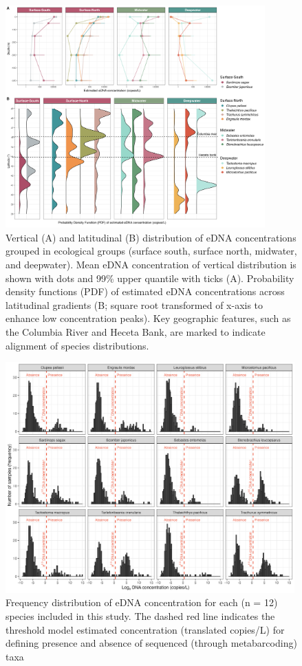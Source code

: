 \documentclass[9pt,twoside,lineno]{pnas-SI}
\begin{document}
\begin{figure}
\centering
\includegraphics[width=0.89\textwidth]{plots/4_Figure_4.jpg}
\caption{Vertical (A) and latitudinal (B) distribution of eDNA concentrations grouped in ecological groups (surface south, surface north, midwater, and deepwater). Mean eDNA concentration of vertical distribution is shown with dots and 99\% upper quantile with ticks (A). Probability density functions (PDF) of estimated eDNA concentrations across latitudinal gradients (B; square root transformed of x-axis to enhance low concentration peaks). Key geographic features, such as the Columbia River and Heceta Bank, are marked to indicate alignment of species distributions.}
\end{figure}

\begin{figure}
\centering
\includegraphics[width=0.99\textwidth]{plots/6_Supplementary_Figure_2.jpg}
\caption{Frequency distribution of eDNA concentration for each (n = 12) species included in this study. The dashed red line indicates the threshold model estimated concentration (translated copies/L) for defining presence and absence of sequenced (through metabarcoding) taxa}
\end{figure}
\end{document}
